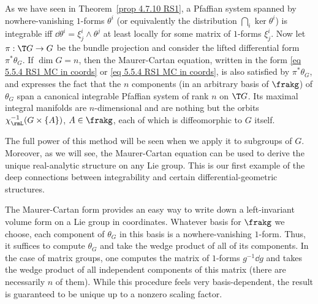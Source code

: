 \begin{rem}
    As we have seen  in Theorem~\ref{prop 4.7.10 RS1}, a Pfaffian system spanned by nowhere-vanishing $1$-forms $\theta^i$ (or equivalently the distribution $\bigcap_i\ker\theta^i$) is integrable iff $\dd \theta^i=\xi^i_j\wedge\theta^j$ at least locally for some matrix of $1$-forms $\xi^i_j$. Now let $\pi:\T G\to G$ be the bundle projection and consider the lifted differential form $\pi^\ast\theta_G$. If $\dim G=n$, then the Maurer-Cartan equation, written in the form \eqref{eq 5.5.4 RS1 MC in coords} or \eqref{eq 5.5.4 RS1 MC in coords}, is also satisfied by $\pi^\ast\theta_G$, and expresses the fact that the $n$ components (in an arbitrary basis of $\frakg$) of $\theta_G$ span a canonical integrable Pfaffian system of rank $n$ on $\T G$. Its maximal integral manifolds are $n$-dimensional and are nothing but the orbits $\chi_\rmL^{-1}(G\times \{A\})$, $A\in\frakg$, each of which is diffeomorphic to $G$ itself. 
    
    The full power of this method will be seen when we apply it to subgroups of $G$. Moreover, as we will see, the Maurer-Cartan equation can be used to derive the unique real-analytic structure on any Lie group. This is our first example of the deep connections between integrability and certain differential-geometric structures.
\end{rem}

\begin{rem}
    The Maurer-Cartan form provides an easy way to write down a left-invariant volume form on a Lie group in coordinates. Whatever basis for $\frakg$ we choose, each component of $\theta_G$ in this basis is a nowhere-vanishing $1$-form. Thus, it suffices to compute $\theta_G$ and take the wedge product of all of its components. In the case of matrix groups, one computes the matrix of $1$-forms $g^{-1}\dd g$ and takes the wedge product of all independent components of this matrix (there are necessarily $n$ of them). While this procedure feels very basis-dependent, the result is guaranteed to be unique up to a nonzero scaling factor.
\end{rem}


